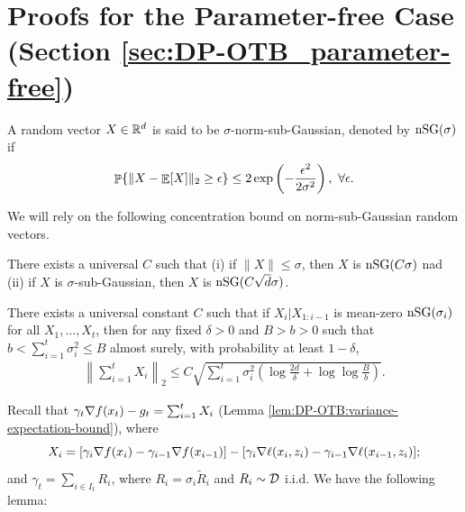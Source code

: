 \section{Proofs for the Parameter-free Case (Section \ref{sec:DP-OTB_parameter-free})}
\label{app:DP-OTB:parameter-free}

\begin{definition}
A random vector $X\in\mathbb R^d$ is said to be $\sigma$-norm-sub-Gaussian, denoted by $\mathrm{nSG}(\sigma)$ if
\begin{align*}
    \mathop{\mathbb{P}}\{\|X-\mathop{\mathbb{E}}[X]\|_2 \geq \epsilon\} \leq 2\exp\left(-\frac{\epsilon^2}{2\sigma^2}\right), \ \forall \epsilon.
\end{align*}
\end{definition}

We will rely on the following concentration bound on norm-sub-Gaussian random vectors.

\begin{lemma}
\label{lem:DP-OTB:normSG}
There exists a universal $C$ such that (i) if $\|X\|\leq \sigma$, then $X$ is $\mathrm{nSG}(C\sigma)$ nad (ii) if $X$ is $\sigma$-sub-Gaussian, then $X$ is $\mathrm{nSG}(C\sqrt{d}\sigma)$. 
\end{lemma}

\begin{lemma}
\label{lem:DP-OTB:nSG-concentration}
There exists a universal constant $C$ such that if $X_i|X_{1:i-1}$ is mean-zero $\mathrm{nSG}(\sigma_i)$ for all $X_1,\ldots,X_t$, then for any fixed $\delta>0$ and $B>b>0$ such that $b<\sum_{i=1}^t \sigma_i^2 \leq B$ almost surely, with probability at least $1-\delta$,
\begin{align*}
    \left\|\sum_{i=1}^t X_i\right\|_2 \leq C\sqrt{\sum_{i=1}^t \sigma_i^2\left(\log\frac{2d}{\delta}+\log\log\frac{B}{b} \right)}.
\end{align*}
\end{lemma}

Recall that $\gamma_t\nabla f(x_t)-g_t=\sum_{i=1}^t X_i$ (Lemma \ref{lem:DP-OTB:variance-expectation-bound}), where
\[
X_i = [\gamma_i\nabla f(x_i)-\gamma_{i-1}\nabla f(x_{i-1})]-[\gamma_i\nabla\ell(x_i,z_i)-\gamma_{i-1}\nabla\ell(x_{i-1},z_i)];
\]
and $\gamma_t = \sum_{i\in I_t}R_i$, where $R_i=\sigma_i\tilde R_i$ and $R_i\sim {\cal D}$ i.i.d. We have the following lemma:

